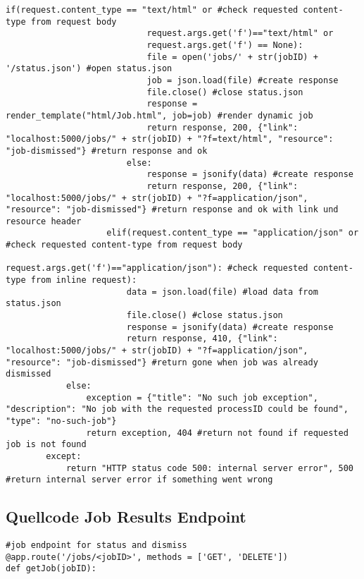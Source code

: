 \begin{lstlisting}[caption={Job Endpoint}, style = Python]
                        if(request.content_type == "text/html" or #check requested content-type from request body
                            request.args.get('f')=="text/html" or 
                            request.args.get('f') == None):
                            file = open('jobs/' + str(jobID) + '/status.json') #open status.json
                            job = json.load(file) #create response   
                            file.close() #close status.json
                            response = render_template("html/Job.html", job=job) #render dynamic job
                            return response, 200, {"link": "localhost:5000/jobs/" + str(jobID) + "?f=text/html", "resource": "job-dismissed"} #return response and ok
                        else:
                            response = jsonify(data) #create response
                            return response, 200, {"link": "localhost:5000/jobs/" + str(jobID) + "?f=application/json", "resource": "job-dismissed"} #return response and ok with link und resource header
                    elif(request.content_type == "application/json" or #check requested content-type from request body
                            request.args.get('f')=="application/json"): #check requested content-type from inline request):
                        data = json.load(file) #load data from status.json 
                        file.close() #close status.json
                        response = jsonify(data) #create response
                        return response, 410, {"link": "localhost:5000/jobs/" + str(jobID) + "?f=application/json", "resource": "job-dismissed"} #return gone when job was already dismissed
            else:
                exception = {"title": "No such job exception", "description": "No job with the requested processID could be found", "type": "no-such-job"}
                return exception, 404 #return not found if requested job is not found 
        except:            
            return "HTTP status code 500: internal server error", 500 #return internal server error if something went wrong
\end{lstlisting}\label{QuellcodeJob}  

\newpage
\subsection{Quellcode Job Results Endpoint}
\begin{lstlisting}[caption={Job Results Endpoint}, style = Python]
#job endpoint for status and dismiss
@app.route('/jobs/<jobID>', methods = ['GET', 'DELETE']) 
def getJob(jobID):
\end{lstlisting}\label{QuellcodeJobResults}  

